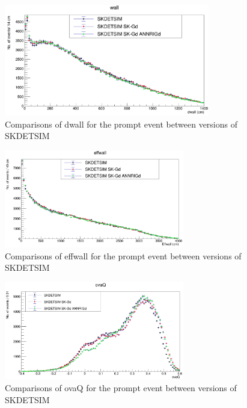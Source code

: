 \begin{figure}
    \centering
    \includegraphics[width=0.8\textwidth]{Figures/dwall_compare.png}
    \caption{Comparisons of dwall for the prompt event between versions of SKDETSIM}
    \label{fig:dwall_compare}

\end{figure}

\begin{figure}
    \centering
    \includegraphics[width=0.7\textwidth]{Figures/effwall_compare.png}
    \caption{Comparisons of effwall for the prompt event between versions of SKDETSIM}
    \label{fig:effwall_compare}

\end{figure}

\begin{figure}
    \centering
    \includegraphics[width=0.7\textwidth]{Figures/ovaQ_compare.png}
    \caption{Comparisons of ovaQ for the prompt event between versions of SKDETSIM }
    \label{fig:ovaQ_compare}

\end{figure}

